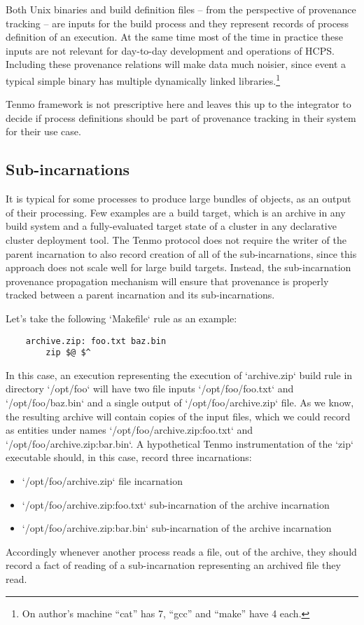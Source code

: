 Both Unix binaries and build definition files -- from the perspective of provenance tracking -- are inputs for the build process and they represent records of process definition of an execution. At the same time most of the time in practice these inputs are not relevant for day-to-day development and operations of HCPS. Including these provenance relations will make data much noisier, since event a typical simple binary has multiple dynamically linked libraries.\footnote{On author's machine ``cat'' has 7, ``gcc'' and ``make'' have 4 each.}

Tenmo framework is not prescriptive here and leaves this up to the integrator to decide if process definitions should be part of provenance tracking in their system for their use case.

\subsection{Sub-incarnations}

It is typical for some processes to produce large bundles of objects, as an output of their processing. Few examples are a build target, which is an archive in any build system and a fully-evaluated target state of a cluster in any declarative cluster deployment tool. The Tenmo protocol does not require the writer of the parent incarnation to also record creation of all of the sub-incarnations, since this approach does not scale well for large build targets. Instead, the sub-incarnation provenance propagation mechanism will ensure that provenance is properly tracked between a parent incarnation and its sub-incarnations.

Let’s take the following `Makefile` rule as an example:

\begin{verbatim}
    archive.zip: foo.txt baz.bin
        zip $@ $^
\end{verbatim}

In this case, an execution representing the execution of `archive.zip` build rule in directory `/opt/foo` will have two file inputs `/opt/foo/foo.txt` and `/opt/foo/baz.bin` and a single output of `/opt/foo/archive.zip` file. As we know, the resulting archive will contain copies of the input files, which we could record as entities under names `/opt/foo/archive.zip:foo.txt` and `/opt/foo/archive.zip:bar.bin`. A hypothetical Tenmo instrumentation of the `zip` executable should, in this case, record three incarnations:
%
\begin{itemize}[nosep]
	\item `/opt/foo/archive.zip` file incarnation
	\item `/opt/foo/archive.zip:foo.txt` sub-incarnation of the archive incarnation
	\item `/opt/foo/archive.zip:bar.bin` sub-incarnation of the archive incarnation
\end{itemize}


Accordingly whenever another process reads a file, out of the archive, they should record a fact of reading of a sub-incarnation representing an archived file they read.
